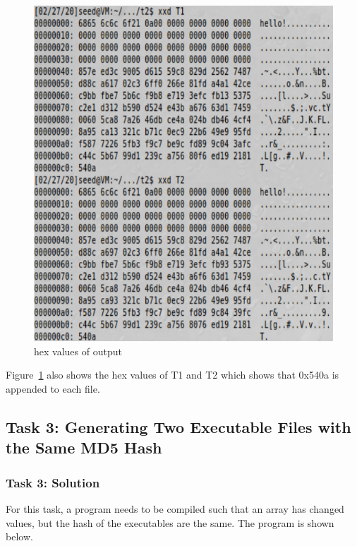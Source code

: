 \documentclass[12pt]{article}
\begin{document}
\begin{figure}[H]
	\begin{center}
		\includegraphics[scale=0.65]{pics/t2p2.png}
	\end{center}{}
	\caption{hex values of output}
	\label{fig:t2p2}
\end{figure}
 
Figure~\ref{fig:t2p2} also shows the hex values of T1 and T2 which shows that 0x540a is appended to each file.

\subsection{Task 3: Generating Two Executable Files with the Same MD5 Hash}
\subsubsection{Task 3: Solution}

For this task, a program needs to be compiled such that an array has changed values, but the hash of the executables are the same. The program is shown below.
\end{document}
